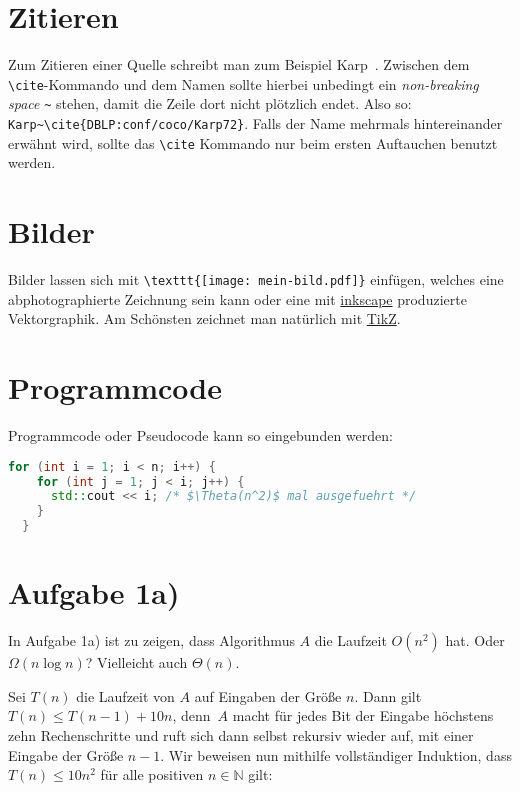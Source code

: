 \documentclass[a4paper,11pt,oneside,ngerman]{scrartcl}
\begin{document}
\section*{Zitieren}

Zum Zitieren einer Quelle schreibt man zum Beispiel Karp~\cite{DBLP:conf/coco/Karp72}.
Zwischen dem \verb|\cite|-Kommando und dem Namen sollte hierbei unbedingt ein \textit{non-breaking space} \verb|~| stehen, damit die Zeile dort nicht plötzlich endet. Also so: \verb|Karp~\cite{DBLP:conf/coco/Karp72}|. Falls der Name mehrmals hintereinander erwähnt wird, sollte das \verb|\cite| Kommando nur beim ersten Auftauchen benutzt werden.


\section*{Bilder}

Bilder lassen sich mit \verb|\texttt{[image: mein-bild.pdf]}| einfügen, welches eine abphotographierte Zeichnung sein kann oder eine mit \href{https://inkscape.org/}{inkscape} produzierte Vektorgraphik. Am Schönsten zeichnet man natürlich mit \href{https://www.overleaf.com/learn/latex/TikZ_package/}{TikZ}.


\section*{Programmcode}

Programmcode oder Pseudocode kann so eingebunden werden:
\begin{lstlisting}[language=C++]
  for (int i = 1; i < n; i++) {
    for (int j = 1; j < i; j++) {
      std::cout << i; /* $\Theta(n^2)$ mal ausgefuehrt */
    }
  }
\end{lstlisting}


\section*{Aufgabe 1a)}

In Aufgabe 1a) ist zu zeigen, dass Algorithmus $A$ die Laufzeit $O(n^2)$ hat. Oder $\Omega(n\log n)$? Vielleicht auch $\Theta(n)$.

Sei $T(n)$ die Laufzeit von $A$ auf Eingaben der Größe $n$.
Dann gilt $T(n)\le T(n-1) + 10n$, denn~$A$ macht für jedes Bit der Eingabe höchstens zehn Rechenschritte und ruft sich dann selbst rekursiv wieder auf, mit einer Eingabe der Größe $n-1$. Wir beweisen nun mithilfe vollständiger Induktion, dass $T(n)\le 10n^2$ für alle positiven $n\in\mathbb{N}$ gilt:
\end{document}
